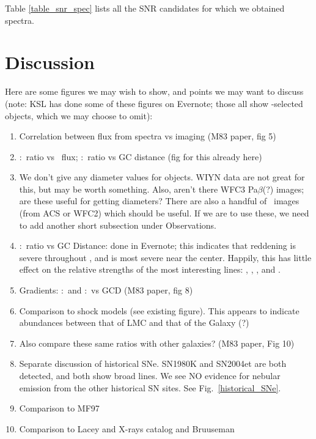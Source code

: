
Table \ref{table_snr_spec}  lists all the SNR candidates for which we obtained spectra.   


\section{Discussion}
Here are some figures we may wish to show, and points we may want to discuss (note: KSL has done some of these figures on Evernote; those all show \oiii-selected objects, which we may choose to omit):
\begin{enumerate}
    \item Correlation between flux from spectra vs imaging (M83 paper, fig 5)
    \item \sii:\ha\ ratio vs \ha\ flux; \sii:\ha\ ratio vs GC distance (fig for this already here)
    \item We don't give any diameter values for objects.  WIYN data are not great for this, but may be worth something.  Also, aren't there WFC3 Pa$\beta$(?) images; are these useful for getting diameters? There are also a handful of \ha\ images (from ACS or WFC2) which should be useful.  If we are to use these, we need to add another short subsection under Observations.
    \item \hb:\ha\ ratio vs GC Distance: done in Evernote; this indicates that reddening is severe throughout \gal, and is most severe near the center.  Happily, this has little effect on the relative strengths of the most interesting lines: \oi, \ha, \nii, and \sii.
    \item Gradients: \nii:\ha\ and \sii:\ha\ vs GCD (M83 paper, fig 8)
    \item Comparison to shock models (see existing figure).  This appears to indicate abundances between that of LMC and that of the Galaxy (?)
    \item Also compare these same ratios with other galaxies? (M83 paper, Fig 10)
    \item Separate discussion of historical SNe.  SN1980K and SN2004et are both detected, and both show broad lines.  We see NO evidence for nebular  emission from the other historical SN sites.  See Fig.~\ref{historical_SNe}.
    \item Comparison to MF97
    \item Comparison to Lacey and X-rays catalog and Bruuseman
\end{enumerate}


